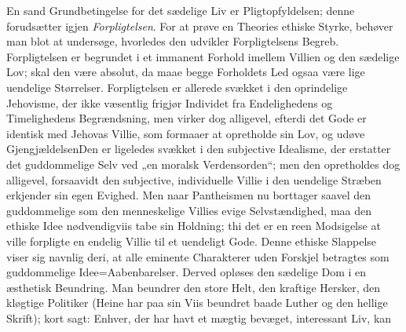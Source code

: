\documentclass[12pt]{book}
\newcommand{\opage}[1]{\marginnote{\footnotesize\textit{[#1]}}}
\begin{document}
En sand Grundbetingelse for det sædelige Liv er Pligtopfyldelsen; denne forudsætter
igjen \emph{Forpligtelsen}. For at prøve en Theories ethiske Styrke, behøver man blot at
\opage{282} %
undersøge, hvorledes den udvikler Forpligtelsens Begreb. Forpligtelsen er begrundet i et
immanent Forhold imellem Villien og den sædelige Lov; skal den være absolut, da maae
begge Forholdets Led ogsaa være lige uendelige Størrelser. Forpligtelsen er allerede
svækket i den oprindelige Jehovisme, der ikke væsentlig frigjør Individet fra
Endelighedens og Timelighedens Begrændsning, men virker dog alligevel, efterdi det Gode
er identisk med Jehovas Villie, som formaaer at opretholde sin Lov, og udøve
Gjengjældelsen\quad Den er ligeledes svækket i den subjective Idealisme, der erstatter
det guddommelige Selv ved „en moralsk Verdensorden“; men den opretholdes dog alligevel,
forsaavidt den subjective, individuelle Villie i den uendelige Stræben erkjender sin
egen Evighed. Men naar Pantheismen nu borttager saavel den guddommelige som den
menneskelige Villies evige Selvstændighed, maa den ethiske Idee nødvendigviis tabe sin
Holdning; thi det er en reen Modsigelse at ville forpligte en endelig Villie til et
uendeligt Gode. Denne ethiske Slappelse viser sig navnlig deri, at alle eminente
Charakterer uden Forskjel betragtes som guddommelige Idee=Aabenbarelser. Derved opløses
den sædelige Dom i en æsthetisk Beundring. Man beundrer den store Helt, den kraftige
Hersker, den kløgtige Politiker (Heine har paa sin Viis beundret baade Luther og den
hellige Skrift); kort sagt: Enhver, der har havt et mægtig bevæget, interessant Liv, kan
\end{document}
